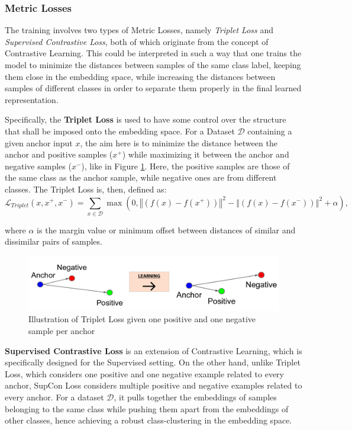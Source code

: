 \subsubsection{Metric Losses}
The training involves two types of Metric Losses, namely \textit{Triplet Loss} and \textit{Supervised Contrastive Loss}, both of which originate from the concept of Contrastive Learning. This could be interpreted in such a way that one trains the model to minimize the distances between samples of the same class label, keeping them close in the embedding space, while increasing the distances between samples of different classes in order to separate them properly in the final learned representation.

Specifically, the \textbf{Triplet Loss} \cite{TripletLoss, TripletLossV2} is used to have some control over the structure that shall be imposed onto the embedding space. For a Dataset $\mathcal{D}$ containing a given anchor input $x$, the aim here is to minimize the distance between the anchor and positive samples ($x^{+}$) while maximizing it between the anchor and negative samples ($x^{-}$), like in Figure \ref{fig:TripletLoss}. Here, the positive samples are those of the same class as the anchor sample, while negative ones are from different classes. The Triplet Loss is, then, defined as:
\[
    \mathcal{L}_{\textit{Triplet}}(x, x^{+}, x^{-}) = \sum_{x \in \mathcal{D}} \max({0, \left\Vert\left(f(x) - f(x^{+})\right) \right\Vert^2} - \left\Vert\left(f(x) - f(x^{-})\right) \right\Vert^2 + \alpha),
\]

where $\alpha$ is the margin value or minimum offset between distances of similar and dissimilar pairs of samples.

\begin{figure}[ht]
    \centering
    \includegraphics[width=1.0\textwidth]{images/TripletLoss.jpg}
    \caption[A Triplet Loss illustration]{Illustration of Triplet Loss given one positive and one negative sample per anchor}
    \label{fig:TripletLoss}
\end{figure}

\textbf{Supervised Contrastive Loss} \cite{SupConLoss} is an extension of Contrastive Learning, which is specifically designed for the Supervised setting. On the other hand, unlike Triplet Loss, which considers one positive and one negative example related to every anchor, SupCon Loss considers multiple positive and negative examples related to every anchor. For a dataset $\mathcal{D}$, it pulls together the embeddings of samples belonging to the same class while pushing them apart from the embeddings of other classes, hence achieving a robust class-clustering in the embedding space.

